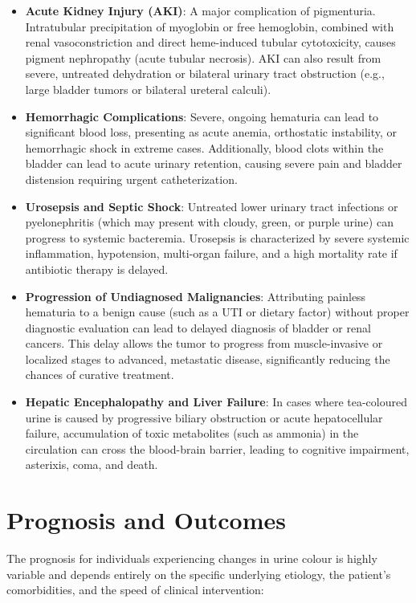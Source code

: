 \begin{itemize}
  \item \textbf{Acute Kidney Injury (AKI)}: A major complication of pigmenturia. Intratubular precipitation of myoglobin or free hemoglobin, combined with renal vasoconstriction and direct heme-induced tubular cytotoxicity, causes pigment nephropathy (acute tubular necrosis). AKI can also result from severe, untreated dehydration or bilateral urinary tract obstruction (e.g., large bladder tumors or bilateral ureteral calculi).

  \item \textbf{Hemorrhagic Complications}: Severe, ongoing hematuria can lead to significant blood loss, presenting as acute anemia, orthostatic instability, or hemorrhagic shock in extreme cases. Additionally, blood clots within the bladder can lead to acute urinary retention, causing severe pain and bladder distension requiring urgent catheterization.

  \item \textbf{Urosepsis and Septic Shock}: Untreated lower urinary tract infections or pyelonephritis (which may present with cloudy, green, or purple urine) can progress to systemic bacteremia. Urosepsis is characterized by severe systemic inflammation, hypotension, multi-organ failure, and a high mortality rate if antibiotic therapy is delayed.

  \item \textbf{Progression of Undiagnosed Malignancies}: Attributing painless hematuria to a benign cause (such as a UTI or dietary factor) without proper diagnostic evaluation can lead to delayed diagnosis of bladder or renal cancers. This delay allows the tumor to progress from muscle-invasive or localized stages to advanced, metastatic disease, significantly reducing the chances of curative treatment.

  \item \textbf{Hepatic Encephalopathy and Liver Failure}: In cases where tea-coloured urine is caused by progressive biliary obstruction or acute hepatocellular failure, accumulation of toxic metabolites (such as ammonia) in the circulation can cross the blood-brain barrier, leading to cognitive impairment, asterixis, coma, and death.
\end{itemize}

\section*{Prognosis and Outcomes}
The prognosis for individuals experiencing changes in urine colour is highly variable and depends entirely on the specific underlying etiology, the patient's comorbidities, and the speed of clinical intervention:

